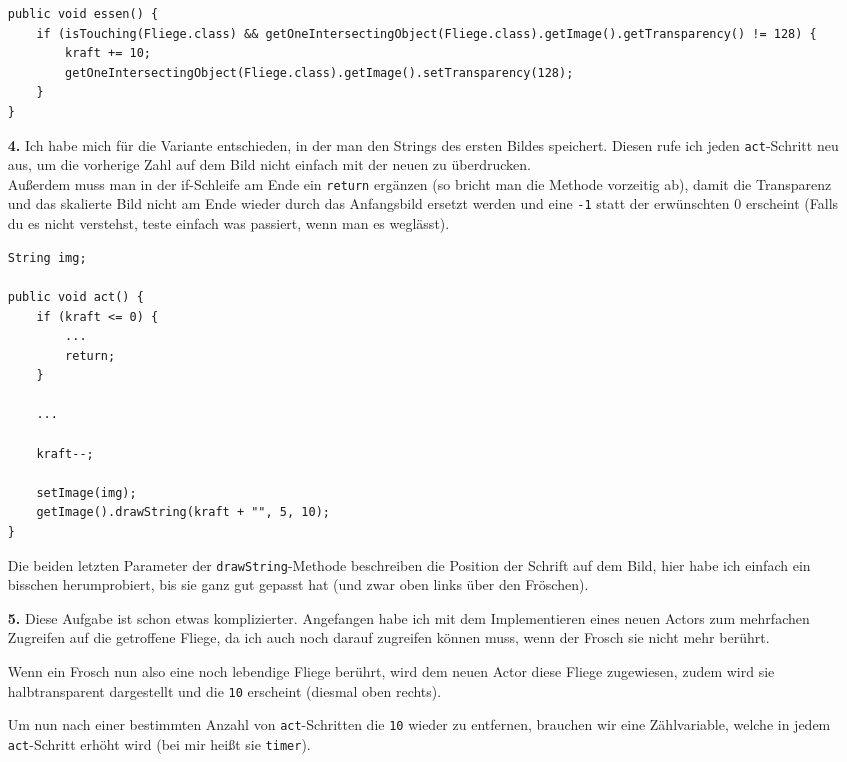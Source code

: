 \documentclass{scrartcl}   %
\begin{document}
\begin{itemize}
    \begin{lstlisting}
public void essen() {
    if (isTouching(Fliege.class) && getOneIntersectingObject(Fliege.class).getImage().getTransparency() != 128) {
        kraft += 10;
        getOneIntersectingObject(Fliege.class).getImage().setTransparency(128);
    }
}
    \end{lstlisting}
    \item[\textbf{4.}] Ich habe mich für die Variante entschieden, in der man den Strings des ersten Bildes speichert. Diesen rufe ich jeden \texttt{act}-Schritt neu aus, um die vorherige Zahl auf dem Bild nicht einfach mit der neuen zu \glqq überdrucken\grqq{}.\\
    Außerdem muss man in der if-Schleife am Ende ein \texttt{return} ergänzen (so bricht man die Methode vorzeitig ab), damit die Transparenz und das skalierte Bild nicht am Ende wieder durch das Anfangsbild ersetzt werden und eine \texttt{-1} statt der erwünschten 0 erscheint (Falls du es nicht verstehst, teste einfach was passiert, wenn man es weglässt).\\
    \begin{lstlisting}
String img;

public void act() {
    if (kraft <= 0) {
        ...
        return;
    }

    ...

    kraft--;
    
    setImage(img);
    getImage().drawString(kraft + "", 5, 10);
}
    \end{lstlisting}
    Die beiden letzten Parameter der \texttt{drawString}-Methode beschreiben die Position der Schrift auf dem Bild, hier habe ich einfach ein bisschen herumprobiert, bis sie ganz gut gepasst hat (und zwar oben links über den Fröschen).
    
    \item[\textbf{5.}] Diese Aufgabe ist schon etwas komplizierter. Angefangen habe ich mit dem Implementieren eines neuen Actors zum mehrfachen Zugreifen auf die getroffene Fliege, da ich auch noch darauf zugreifen können muss, wenn der Frosch sie nicht mehr berührt.
    
    Wenn ein Frosch nun also eine noch lebendige Fliege berührt, wird dem neuen Actor diese Fliege zugewiesen, zudem wird sie halbtransparent dargestellt und die \texttt{10} erscheint (diesmal oben rechts).
    
    Um nun nach einer bestimmten Anzahl von \texttt{act}-Schritten die \texttt{10} wieder zu entfernen, brauchen wir eine Zählvariable, welche in jedem \texttt{act}-Schritt erhöht wird (bei mir heißt sie \texttt{timer}).
    

\end{itemize}
\end{document}
